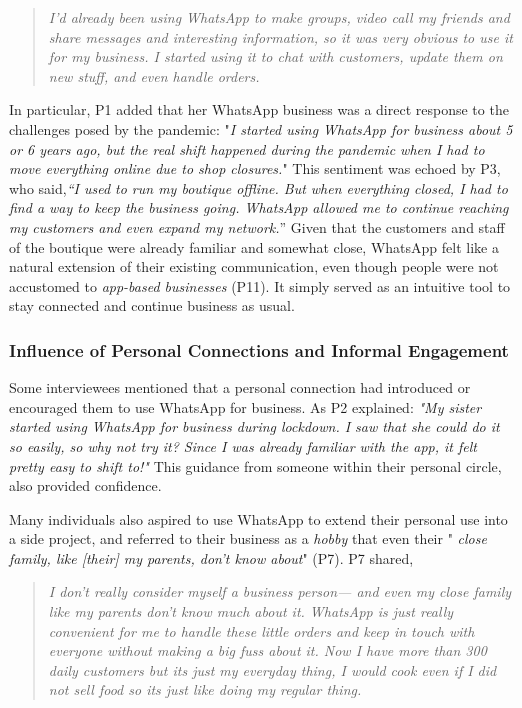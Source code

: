 \begin{quote}
     \textit{I’d already been using WhatsApp to make groups, video call my friends and share messages and interesting information, so it was very obvious to use it for my business. I started using it to chat with customers, update them on new stuff, and even handle orders.}
\end{quote}


In particular, P1 added that her WhatsApp business was a direct response to the challenges posed by the pandemic: "\textit{I started using WhatsApp for business about 5 or 6 years ago, but the real shift happened during the pandemic when I had to move everything online due to shop closures.}" This sentiment was echoed by P3, who said,\textit{“I used to run my boutique offline. But when everything closed, I had to find a way to keep the business going. WhatsApp allowed me to continue reaching my customers and even expand my network.}” Given that the customers and staff of the boutique were already familiar and somewhat close, WhatsApp felt like a natural extension of their existing communication, even though people were not accustomed to \textit{app-based businesses} (P11). It simply served as an intuitive tool to stay connected and continue business as usual.




\subsubsection{Influence of Personal Connections and Informal Engagement}

Some interviewees mentioned that a personal connection had introduced or encouraged them to use WhatsApp for business. As P2 explained: \textit{"My sister started using WhatsApp for business during lockdown. I saw that she could do it so easily, so why not try it? Since I was already familiar with the app, it felt pretty easy to shift to!"} This guidance from someone within their personal circle, also provided confidence. 

Many individuals also aspired to use WhatsApp to extend their personal use into a side project, and referred to their business as a \textit{hobby} that even their "\textit{ close family, like [their] my parents, don't know about}" (P7). P7 shared, 

\begin{quote}
    \textit{I don’t really consider myself a business person— and even my close family like my parents don’t know much about it. WhatsApp is just really convenient for me to handle these little orders and keep in touch with everyone without making a big fuss about it. Now I have more than 300 daily customers but its just my everyday thing, I would cook even if I did not sell food so its just like doing my regular thing.} 
\end{quote}

